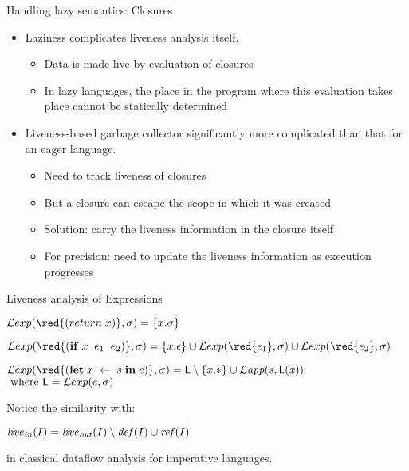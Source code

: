 \documentclass[xcolor=x11names,compress,mathserif]{beamer}
\renewcommand{\(}{\begin{columns}}
\renewcommand{\)}{\end{columns}}
\newcommand{\<}[1]{\begin{column}{#1}}
\renewcommand{\>}{\end{column}}
\begin{document}
\begin{frame}{Handling lazy semantics: Closures}
\normalsize
  \begin{itemize}\itemsep2em
  \item Laziness complicates liveness analysis itself. 
    \begin{itemize}
    \item Data is made live by evaluation of closures
    \item In lazy languages, the place in the program
      where this evaluation takes place cannot be statically determined
    \end{itemize}
    \pause
  \item Liveness-based garbage collector significantly more complicated than that for an eager language.
    \begin{itemize}
    \item Need to track liveness of closures
    \item But a closure can escape the scope in which it was created
     \item Solution: carry the liveness information in the closure itself
     \item For precision: need to update the liveness information as execution progresses
    \end{itemize}
  \end{itemize}
\end{frame}
\begin{frame}{Liveness analysis of Expressions}

\normalsize
$\Lexp{{\red{(return\; x)}}}{\sigma} = \{x.\sigma\}$


\bigskip
\medskip

  $\Lexp{{\red{(\SIF \; x\;\;  e_1\; \; e_2)}}}{\sigma} = \{x.\epsilon\} 
 \cup \Lexp{{\red{ e_1}}}{\sigma} \cup \Lexp{{\red{e_2}}}{\sigma}$



\bigskip
\medskip

$  \Lexp{{\red{(\LET \; x\; \leftarrow \; s \; \IN \; e)}}}{\sigma} = \Lv
           \setminus \{x.*\}
           \cup \mathit{\Lapp{s}{\Lv(x)}}$\\
\hspace*{4.5cm} $ \mbox{ where } \mathsf{L} = \mathcal{L}exp(e,\sigma)$

\bigskip

\pause
Notice the similarity with:
\bigskip

\centerline{$\mathit{live}_\mathit{in}(I)      =     \mathit{live}_\mathit{out}(I)
\setminus \mathit{def\/}(I) \cup \mathit{ref\/}(I)$}
\bigskip

in classical dataflow analysis for imperative languages.
\end{frame}
\end{document}
